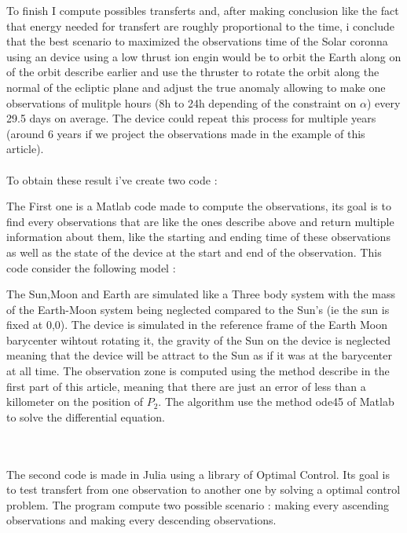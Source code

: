 \documentclass[11pt]{article} %
\begin{document}
			 To finish I compute possibles transferts and, after making conclusion like the fact that energy needed for transfert are roughly proportional to the time, i conclude that the best scenario to maximized the observations time of the Solar coronna using an device using a low thrust ion engin would be to orbit the Earth along on of the orbit describe earlier and use the thruster to rotate the orbit along the normal of the ecliptic plane and adjust the true anomaly allowing to make one observations of mulitple hours (8h to 24h depending of the constraint on $\alpha$) every 29.5 days on average. The device could repeat this process for multiple years (around 6 years if we project the observations made in the example of this article). 
			 \\ \\
			 To obtain these result i've create two code :
			 
			 The First one is a Matlab code made to compute the observations, its goal is to find every observations that are like the ones describe above and return multiple information about them, like the starting and ending time of these observations as well as the state of the device at the start and end of the observation.
			 This code consider the following model : 
			 
			 The Sun,Moon and Earth are simulated like a Three body system with the mass of the Earth-Moon system being neglected compared to the Sun's (ie the sun is fixed at 0,0). The device is simulated in the reference frame of the Earth Moon barycenter wihtout rotating it, the gravity of the Sun on the device is neglected meaning that the device will be attract to the Sun as if it was at the barycenter at all time. 
			 The observation zone is computed using the method describe in the first part of this article, meaning that there are just an error of less than a killometer on the position of $P_2$.
			 The algorithm use the method ode45 of Matlab to solve the differential equation.
			 
			 \\ \\
			 The second code is made in Julia using a library of Optimal Control. Its goal is to test transfert from one observation to another one by solving a optimal control problem. The program compute two possible scenario : making every ascending observations and making every descending observations.
			 
			 
			 
			 
			 
\end{document}

